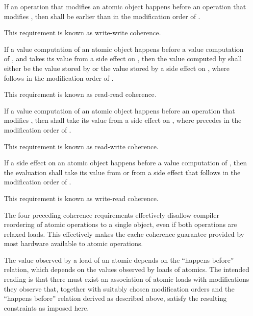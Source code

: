 \pnum
If an operation  that modifies an atomic object  happens before
an operation  that modifies , then  shall be earlier
than  in the modification order of . \begin{note} This requirement
is known as write-write coherence. \end{note}

\pnum
If a
%
value computation  of an atomic object  happens before a
value computation  of , and  takes its value from a side
effect  on , then the value computed by  shall either be
the value stored by  or the value stored by a
%
side effect  on
, where  follows  in the modification order of .
\begin{note} This requirement is known as read-read coherence. \end{note}

\pnum
If a
%
value computation  of an atomic object  happens before an
operation  that modifies , then  shall take its value from a side
effect  on , where  precedes  in the
modification order of . \begin{note} This requirement is known as
read-write coherence. \end{note}

\pnum
If a
%
side effect  on an atomic object  happens before a value
computation  of , then the evaluation  shall take its
value from  or from a
%
side effect  that follows  in the
modification order of . \begin{note} This requirement is known as
write-read coherence. \end{note}

\pnum
\begin{note} The four preceding coherence requirements effectively disallow
compiler reordering of atomic operations to a single object, even if both
operations are relaxed loads. This effectively makes the cache coherence
guarantee provided by most hardware available to \Cpp atomic operations.
\end{note}

\pnum
\begin{note} The value observed by a load of an atomic depends on the ``happens
before'' relation, which depends on the values observed by loads of atomics.
The intended reading is that there must exist an
association of atomic loads with modifications they observe that, together with
suitably chosen modification orders and the ``happens before'' relation derived
as described above, satisfy the resulting constraints as imposed here. \end{note}

